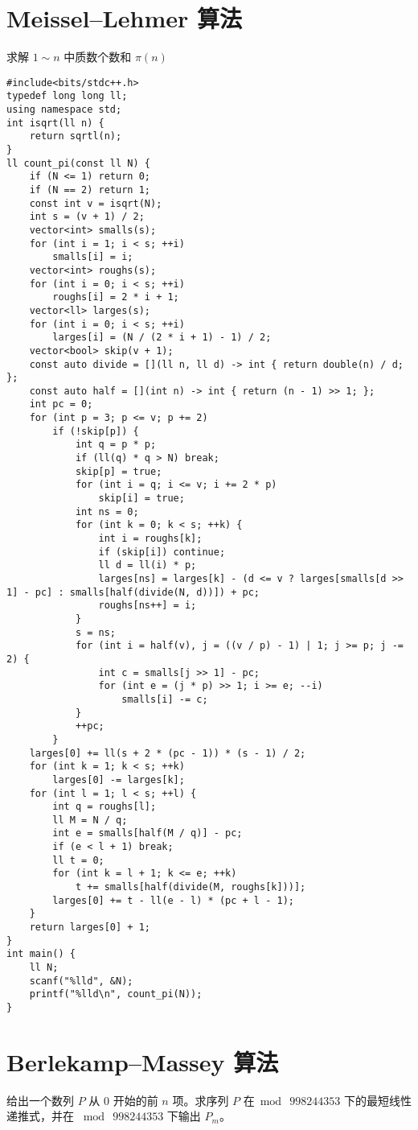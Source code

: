 \section{Meissel–Lehmer 算法}
\par \noindent 求解 $1 \sim n$ 中质数个数和 $\pi(n)$
\begin{verbatim}
#include<bits/stdc++.h>
typedef long long ll;
using namespace std;
int isqrt(ll n) {
    return sqrtl(n);
}
ll count_pi(const ll N) {
    if (N <= 1) return 0;
    if (N == 2) return 1;
    const int v = isqrt(N);
    int s = (v + 1) / 2;
    vector<int> smalls(s);
    for (int i = 1; i < s; ++i)
        smalls[i] = i;
    vector<int> roughs(s);
    for (int i = 0; i < s; ++i)
        roughs[i] = 2 * i + 1;
    vector<ll> larges(s);
    for (int i = 0; i < s; ++i)
        larges[i] = (N / (2 * i + 1) - 1) / 2;
    vector<bool> skip(v + 1);
    const auto divide = [](ll n, ll d) -> int { return double(n) / d; };
    const auto half = [](int n) -> int { return (n - 1) >> 1; };
    int pc = 0;
    for (int p = 3; p <= v; p += 2)
        if (!skip[p]) {
            int q = p * p;
            if (ll(q) * q > N) break;
            skip[p] = true;
            for (int i = q; i <= v; i += 2 * p)
                skip[i] = true;
            int ns = 0;
            for (int k = 0; k < s; ++k) {
                int i = roughs[k];
                if (skip[i]) continue;
                ll d = ll(i) * p;
                larges[ns] = larges[k] - (d <= v ? larges[smalls[d >> 1] - pc] : smalls[half(divide(N, d))]) + pc;
                roughs[ns++] = i;
            }
            s = ns;
            for (int i = half(v), j = ((v / p) - 1) | 1; j >= p; j -= 2) {
                int c = smalls[j >> 1] - pc;
                for (int e = (j * p) >> 1; i >= e; --i)
                    smalls[i] -= c;
            }
            ++pc;
        }
    larges[0] += ll(s + 2 * (pc - 1)) * (s - 1) / 2;
    for (int k = 1; k < s; ++k)
        larges[0] -= larges[k];
    for (int l = 1; l < s; ++l) {
        int q = roughs[l];
        ll M = N / q;
        int e = smalls[half(M / q)] - pc;
        if (e < l + 1) break;
        ll t = 0;
        for (int k = l + 1; k <= e; ++k)
            t += smalls[half(divide(M, roughs[k]))];
        larges[0] += t - ll(e - l) * (pc + l - 1);
    }
    return larges[0] + 1;
}
int main() {
    ll N;
    scanf("%lld", &N);
    printf("%lld\n", count_pi(N));
}
\end{verbatim}


\section{Berlekamp–Massey 算法}
\begin{tcolorbox}
\par \noindent 给出一个数列 $P$ 从 $0$ 开始的前 $n$ 项。求序列 $P$ 在$\bmod\ 998244353$ 下的最短线性递推式，并在 $\bmod~998244353$ 下输出 $P_m$。
\end{tcolorbox}


